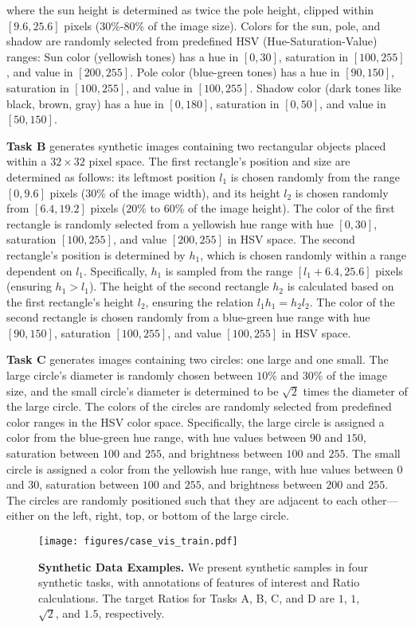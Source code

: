 where the sun height is determined as twice the pole height, clipped within \([9.6, 25.6]\) pixels (30\%-80\% of the image size). Colors for the sun, pole, and shadow are randomly selected from predefined HSV (Hue-Saturation-Value) ranges: Sun color (yellowish tones) has a hue in \([0, 30]\), saturation in \([100, 255]\), and value in \([200, 255]\). Pole color (blue-green tones) has a hue in \([90, 150]\), saturation in \([100, 255]\), and value in \([100, 255]\). Shadow color (dark tones like black, brown, gray) has a hue in \([0, 180]\), saturation in \([0, 50]\), and value in \([50, 150]\). 


\textbf{Task B}  generates synthetic images containing two rectangular objects placed within a \(32 \times 32\) pixel space. The first rectangle's position and size are determined as follows: its leftmost position \( l_1 \) is chosen randomly from the range \([0, 9.6]\) pixels ($30\%$ of the image width), and its height \( l_2 \) is chosen randomly from \([6.4, 19.2]\) pixels ($20\%$ to 60\% of the image height). The color of the first rectangle is randomly selected from a yellowish hue range with hue \([0, 30]\), saturation \([100, 255]\), and value \([200, 255]\) in HSV space. The second rectangle's position is determined by \( h_1 \), which is chosen randomly within a range dependent on \( l_1 \). Specifically, \( h_1 \) is sampled from the range \([l_1 + 6.4, 25.6]\) pixels (ensuring \( h_1 > l_1 \)). The height of the second rectangle \( h_2 \) is calculated based on the first rectangle's height \( l_2 \), ensuring the relation \( l_1{h_1} = {h_2}{l_2} \). The color of the second rectangle is chosen randomly from a blue-green hue range with hue \([90, 150]\), saturation \([100, 255]\), and value \([100, 255]\) in HSV space.

\textbf{Task C}  generates images containing two circles: one large and one small. The large circle's diameter is randomly chosen between $10\%$ and $30\%$ of the image size, and the small circle's diameter is determined to be \(\sqrt{2}\) times the diameter of the large circle. The colors of the circles are randomly selected from predefined color ranges in the HSV color space. Specifically, the large circle is assigned a color from the blue-green hue range, with hue values between $90$ and $150$, saturation between $100$ and $255$, and brightness between $100$ and $255$. The small circle is assigned a color from the yellowish hue range, with hue values between $0$ and $30$, saturation between $100$ and $255$, and brightness between $200$ and $255$. The circles are randomly positioned such that they are adjacent to each other—either on the left, right, top, or bottom of the large circle. 
\begin{figure}[]
  \centering  \texttt{[image: figures/case\_vis\_train.pdf]}
  \vspace*{-5mm}
  \caption{\textbf{Synthetic Data Examples.} We present synthetic samples in four synthetic tasks, with annotations of features of interest and Ratio calculations. The target Ratios for Tasks A, B, C, and D are $1$, $1$, $\sqrt{2}$, and $1.5$, respectively.}
  \label{fig:case_vis_train}
\end{figure}

